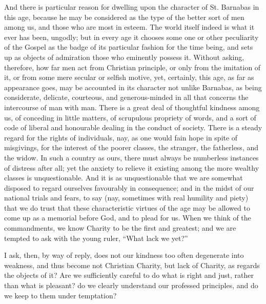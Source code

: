 And there is particular reason for dwelling upon the character of St.
Barnabas in this age, because he may be considered as the type of the
better sort of men among us, and those who are most in esteem. The world
itself indeed is what it ever has been, ungodly; but in every age it
chooses some one or other peculiarity of the Gospel as the badge of its
particular fashion for the time being, and sets up as objects of
admiration those who eminently possess it. Without asking, therefore,
how far men act from Christian principle, or only from the imitation of
it, or from some mere secular or selfish motive, yet, certainly, this
age, as far as appearance goes, may be accounted in its character not
unlike Barnabas, as being considerate, delicate, courteous, and
generous-minded in all that concerns the intercourse of man with man.
There is a great deal of thoughtful kindness among us, of conceding in
little matters, of scrupulous propriety of words, and a sort of code of
liberal and honourable dealing in the conduct of society. There is a
steady regard for the rights of individuals, nay, as one would fain hope
in spite of misgivings, for the interest of the poorer classes, the
stranger, the fatherless, and the widow. In such a country as ours,
there must always be numberless instances of distress after all; yet the
anxiety to relieve it existing among the more wealthy classes is
unquestionable. And it is as unquestionable that we are somewhat
disposed to regard ourselves favourably in consequence; and in the midst
of our national trials and fears, to say (nay, sometimes with real
humility and piety) that we do trust that these characteristic virtues
of the age may be allowed to come up as a memorial before God, and to
plead for us. When we think of the commandments, we know Charity to be
the first and greatest; and we are tempted to ask with the young ruler,
``What lack we yet?''

I ask, then, by way of reply, does not our kindness too often
degenerate into weakness, and thus become not Christian Charity, but
lack of Charity, as regards the objects of it? Are we sufficiently
careful to do what is right and just, rather than what is pleasant? do
we clearly understand our professed principles, and do we keep to them
under temptation?

